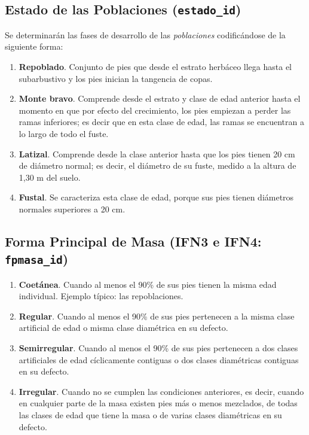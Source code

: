 \subsection{Estado de las Poblaciones (\texttt{estado\_id})}\label{sec:EstadoIFN34}

Se determinarán las fases de desarrollo de las \textit{poblaciones} codificándose de la siguiente forma:

\begin{enumerate}
    \item \textbf{Repoblado}. Conjunto de pies que desde el estrato herbáceo llega hasta el subarbustivo y los pies inician la tangencia de copas.
    \item \textbf{Monte bravo}. Comprende desde el estrato y clase de edad anterior hasta el momento en que por efecto del crecimiento, los pies empiezan a perder las ramas inferiores; es decir que en esta clase de edad, las ramas se encuentran a lo largo de todo el fuste.
    \item \textbf{Latizal}. Comprende desde la clase anterior hasta que los pies tienen 20 cm de diámetro normal; es decir, el diámetro de su fuste, medido a la altura de 1,30 m del suelo.
    \item \textbf{Fustal}. Se caracteriza esta clase de edad, porque sus pies tienen diámetros normales superiores a 20 cm.
\end{enumerate}


\subsection{Forma Principal de Masa (IFN3 e IFN4: \texttt{fpmasa\_id})}\label{sec:FPMasa}

\begin{enumerate}
    \item \textbf{Coetánea}. Cuando al menos el 90\% de sus pies tienen la misma edad individual. Ejemplo típico: las repoblaciones.
    \item \textbf{Regular}. Cuando al menos el 90\% de sus pies pertenecen a la misma clase artificial de edad o misma clase diamétrica en su defecto.
    \item \textbf{Semirregular}. Cuando al menos el 90\% de sus pies pertenecen a dos clases artificiales de edad cíclicamente contiguas o dos clases diamétricas contiguas en su defecto.
    \item \textbf{Irregular}. Cuando no se cumplen las condiciones anteriores, es decir, cuando en cualquier parte de la masa existen pies más o menos mezclados, de todas las clases de edad que tiene la masa o de varias clases diamétricas en su defecto.
\end{enumerate}


